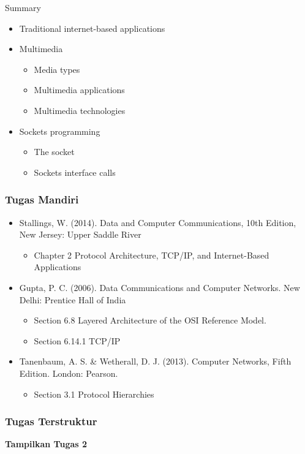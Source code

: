 \documentclass[pdflatex,compress]{beamer}
\begin{document}
\begin{frame}{Summary}
	\begin{itemize}
		\item Traditional internet-based applications
		\item Multimedia
		\begin{itemize}
			\item Media types
			\item Multimedia applications
			\item Multimedia technologies
		\end{itemize}
		\item Sockets programming
		\begin{itemize}
			\item The socket
			\item Sockets interface calls
		\end{itemize}
	\end{itemize}
\end{frame}

\begin{frame}
	\frametitle{Tugas Mandiri}
	\begin{itemize}
		\item Stallings, W. (2014). Data and Computer Communications, 10th Edition, New Jersey: Upper Saddle River\\
		\begin{itemize}
			\item Chapter 2 Protocol Architecture, TCP/IP, and Internet-Based Applications
		\end{itemize}
		\item Gupta, P. C. (2006). Data Communications and Computer Networks. New Delhi: Prentice Hall of India\\
		\begin{itemize}
			\item Section 6.8 Layered Architecture of the OSI Reference Model.
			\item Section 6.14.1 TCP/IP
		\end{itemize}
		\item Tanenbaum, A. S. \& Wetherall, D. J. (2013). Computer Networks, Fifth Edition. London: Pearson.\\
		\begin{itemize}
			\item Section 3.1 Protocol Hierarchies
		\end{itemize}
	\end{itemize}
\end{frame}

\begin{frame}
	\frametitle{Tugas Terstruktur}
	\textbf{Tampilkan Tugas 2}
\end{frame}
\end{document}
